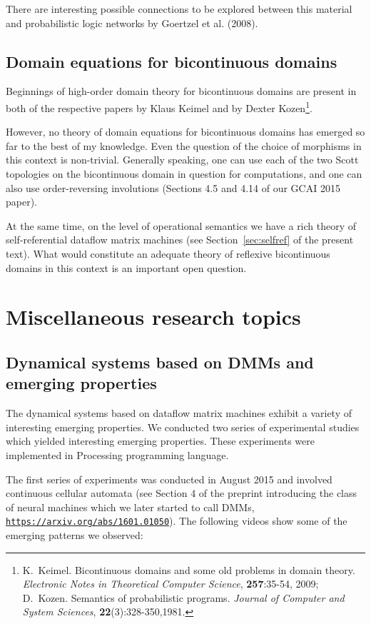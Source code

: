 \documentclass{article}
\begin{document}
There are interesting possible connections to be explored between this material and probabilistic logic networks by Goertzel et al. (2008).

\subsection{Domain equations for bicontinuous domains}

Beginnings of high-order domain theory for bicontinuous domains are present in both of the respective papers by Klaus Keimel and by Dexter Kozen\footnote{K.~Keimel. Bicontinuous domains and some old problems in domain theory. {\em Electronic Notes in Theoretical Computer Science}, {\bf 257}:35-54, 2009; D.~Kozen. Semantics of probabilistic programs. {\em Journal of Computer and System Sciences}, {\bf 22}(3):328-350,1981.}.

However, no theory of domain equations for bicontinuous domains has emerged so far to the best of my knowledge.
Even the question of the choice of morphisms in this context is non-trivial. Generally speaking, one can use each of the two Scott topologies
on the bicontinuous domain in question for computations, and one can also use order-reversing involutions (Sections 4.5 and 4.14 of our GCAI 2015 paper).

At the same time, on the level of operational semantics we have a rich theory of self-referential dataflow
matrix machines (see Section~\ref{sec:selfref} of the present text). What would constitute an adequate theory of reflexive bicontinuous domains in this context is an important open question.

\section{Miscellaneous research topics}

\subsection{Dynamical systems based on DMMs and emerging properties}

The dynamical systems based on dataflow
matrix machines exhibit a variety of interesting emerging properties. We conducted two series of experimental studies which yielded interesting emerging properties. These experiments were implemented in Processing programming language.

The first series of experiments was conducted in August 2015 and involved continuous cellular automata (see Section 4 of the preprint introducing the class of neural machines which we later started to call DMMs, \href{https://arxiv.org/abs/1601.01050}{\tt https://arxiv.org/abs/1601.01050}). The following videos show some of the emerging patterns we observed:
\end{document}
